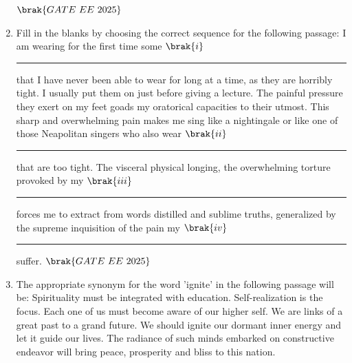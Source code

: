 \documentclass[journal,12pt,onecolumn]{IEEEtran}
\theoremstyle{remark}
\begin{document}
\begin{enumerate}
\hfill $\brak{GATE\ EE\ 2025}$ 
    \begin{enumerate}
    \end{enumerate}
   \item Fill in the blanks by choosing the correct sequence for the following passage: 
 I am wearing for the first time some  $\brak{i}$\rule{2cm}{0.4pt} that I have never been able to wear for long at a time, as they are horribly tight. I usually put them on just before giving a lecture. The painful pressure they exert on my feet goads my oratorical capacities to their utmost. This sharp and overwhelming pain makes me sing like a nightingale or like one of those Neapolitan singers who also wear  $\brak{ii}$\rule{2cm}{0.4pt} that are too tight. The visceral physical longing, the overwhelming torture provoked by my  $\brak{iii}$\rule{2cm}{0.4pt}  forces me to extract from words distilled and sublime truths, generalized by the supreme inquisition of the pain my  $\brak{iv}$\rule{2cm}{0.4pt} suffer.
\hfill $\brak{GATE\ EE\ 2025}$ 
    \begin{enumerate}
    \end{enumerate}
  \item The appropriate synonym for the word 'ignite' in the following passage will be: 
Spirituality must be integrated with education. Self-realization is the focus. Each one of us must become aware of our higher self. We are links of a great past to a grand future. We should ignite our dormant inner energy and let it guide our lives. The radiance of such minds embarked on constructive endeavor will bring peace, prosperity and bliss to this nation. 

\end{enumerate}
\end{document}
